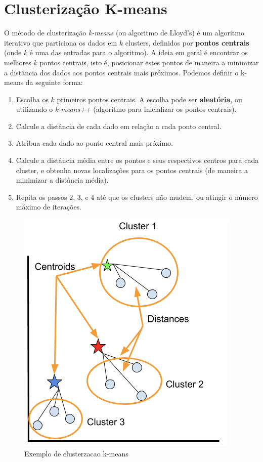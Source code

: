  \section{Clusterização K-means}
O método de clusterização \emph{k-means} (ou algoritmo de Lloyd's) é um algoritmo iterativo que particiona os dados em $k$ clusters, definidos por \textbf{pontos centrais} (onde $k$ é uma das entradas para o algoritmo).
A ideia em geral é encontrar os melhores $k$ pontos centrais, isto é, posicionar estes pontos de maneira a minimizar a distância dos dados aos pontos centrais mais próximos. 
Podemos definir o k-means da seguinte forma:
 \begin{enumerate}
 	\item Escolha os $k$ primeiros pontos centrais. A escolha pode ser \textbf{aleatória}, ou utilizando o \emph{k-means++} (algoritmo para inicializar os pontos centrais).
	\item Calcule a distância de cada dado em relação a cada ponto central.
	\item Atribua cada dado ao ponto central mais próximo.
	\item Calcule a distância média entre os pontos e seus respectivos centros para cada cluster, e obtenha novas localizações para os pontos centrais (de maneira a minimizar a distância média).
	\item Repita os passos 2, 3, e 4 até que os clusters não mudem, ou atingir o número máximo de iterações.
\end{enumerate}
 
 \begin{figure}[H]
   \centering
   \includegraphics[scale=0.40]{figs/kmeans.png}
    \caption{Exemplo de clusterzacao k-means}
    \label{fig:kmeans}
 \end{figure}
 
